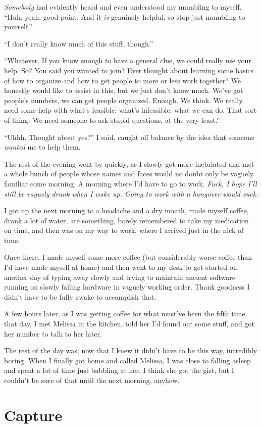 \documentclass[a5paper]{report}%
\newcommand\spacer{{\center{$\cdots\\$}}}
\begin{document}
\textit{Somebody} had evidently heard and even understood my mumbling to myself.
``Huh, yeah, good point. And it \textit{is} genuinely helpful, so stop just
mumbling to yourself.''

``I don't really know much of this stuff, though.''

``Whatever. If you know enough to have a general clue, we could really use your
help. So? You said you wanted to join? Ever thought about learning some basics
of how to organize and how to get people to more or less work together? We
honestly would like to assist in this, but we just don't know much. We've got
people's numbers, we can get people organized. Enough. We think. We really
need some help with what's feasible, what's infeasible, what we can do. That
sort of thing. We need someone to ask stupid questions, at the very least.''

``Uhhh. Thought about yes?'' I said, caught off balance by the idea that someone
\textit{wanted} me to help them.

The rest of the evening went by quickly, as I slowly got more inebriated and met
a whole bunch of people whose names and faces would no doubt only be vaguely
familiar come morning. A morning where I'd have to go to work. \textit{Fuck, I
  hope I'll still be vaguely drunk when I wake up. Going to work with a
  hangover would suck.}

\spacer

I got up the next morning to a headache and a dry mouth, made myself coffee,
drank a lot of water, ate something, barely remembered to take my medication on
time, and then was on my way to work, where I arrived just in the nick of time.

Once there, I made myself some more coffee (but considerably worse coffee than
I'd have made myself at home) and then went to my desk to get
started on another day of typing away slowly and trying to maintain ancient
software running on slowly failing hardware in vaguely working order. Thank
goodness I didn't have to be fully awake to accomplish that.

\spacer

A few hours later, as I was getting coffee for what must've been the fifth time
that day, I met Melissa in the kitchen, told her I'd found out some stuff, and
got her number to talk to her later.

The rest of the day was, now that I knew it didn't have to be this way,
incredibly boring. When I finally got home and called Melissa, I was close to
falling asleep and spent a lot of time just babbling at her. I think she got the
gist, but I couldn't be sure of that until the next morning, anyhow.

\chapter{Capture}




\end{document}
